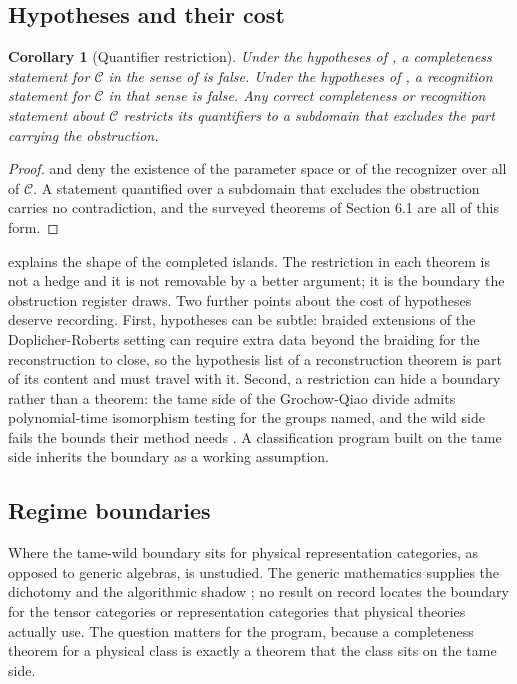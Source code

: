 \documentclass[11pt,letterpaper]{article}
\newtheorem{corollary}[theorem]{Corollary}
\theoremstyle{definition}
\theoremstyle{remark}
\begin{document}
\subsection{Hypotheses and their cost}

\begin{corollary}[Quantifier restriction]
\label{cor:restrict}
Under the hypotheses of , a completeness statement for $\mathcal{C}$ in the sense of  is false. Under the hypotheses of , a recognition statement for $\mathcal{C}$ in that sense is false. Any correct completeness or recognition statement about $\mathcal{C}$ restricts its quantifiers to a subdomain that excludes the part carrying the obstruction.
\end{corollary}

\begin{proof}
 and  deny the existence of the parameter space or of the recognizer over all of $\mathcal{C}$. A statement quantified over a subdomain that excludes the obstruction carries no contradiction, and the surveyed theorems of Section 6.1 are all of this form.
\end{proof}

 explains the shape of the completed islands. The restriction in each theorem is not a hedge and it is not removable by a better argument; it is the boundary the obstruction register draws. Two further points about the cost of hypotheses deserve recording. First, hypotheses can be subtle: braided extensions of the Doplicher-Roberts setting can require extra data beyond the braiding for the reconstruction to close, so the hypothesis list of a reconstruction theorem is part of its content and must travel with it. Second, a restriction can hide a boundary rather than a theorem: the tame side of the Grochow-Qiao divide admits polynomial-time isomorphism testing for the groups named, and the wild side fails the bounds their method needs \cite{grochow2015}. A classification program built on the tame side inherits the boundary as a working assumption.

\subsection{Regime boundaries}

Where the tame-wild boundary sits for physical representation categories, as opposed to generic algebras, is unstudied. The generic mathematics supplies the dichotomy and the algorithmic shadow \cite{bekkert2003,grochow2015}; no result on record locates the boundary for the tensor categories or representation categories that physical theories actually use. The question matters for the program, because a completeness theorem for a physical class is exactly a theorem that the class sits on the tame side.
\end{document}
